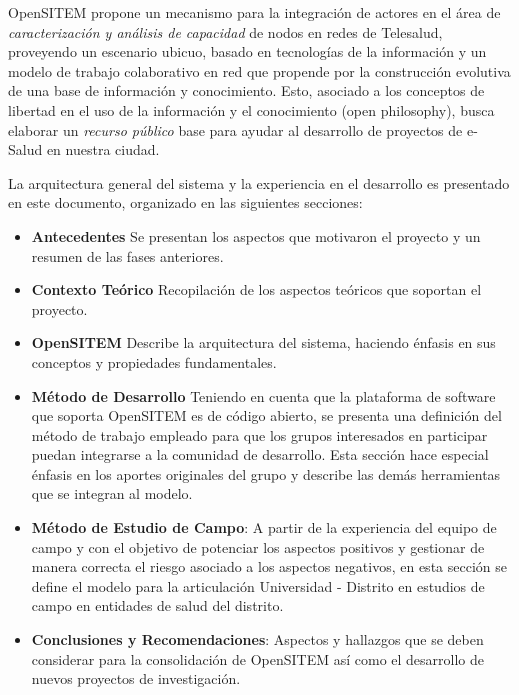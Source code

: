 OpenSITEM propone un mecanismo para la integración de actores en el área de \textit{caracterización y análisis de capacidad} de nodos en redes de Telesalud, proveyendo un escenario ubicuo, basado en tecnologías de la información y un modelo de trabajo colaborativo en red que propende por la construcción evolutiva de una base de información y conocimiento. Esto, asociado a los conceptos de libertad en el uso de la información y el conocimiento (open philosophy), busca elaborar un \textit{recurso público} base para ayudar al desarrollo de proyectos de e-Salud en nuestra ciudad. 

La arquitectura general del sistema y la experiencia en el desarrollo es presentado en este documento, organizado en las siguientes secciones:

\begin{itemize}
 \item \textbf{Antecedentes} Se presentan los aspectos que motivaron el proyecto y un resumen de las fases anteriores.
 \item \textbf{Contexto Teórico} Recopilación de los aspectos teóricos que soportan el proyecto. 
 \item \textbf{OpenSITEM} Describe la arquitectura del sistema, haciendo énfasis en sus conceptos y propiedades fundamentales.
 \item \textbf{Método de Desarrollo} Teniendo en cuenta que la plataforma de software que soporta OpenSITEM es de código abierto, se presenta una definición del método de trabajo empleado para que los grupos interesados en participar puedan integrarse a la comunidad de desarrollo. Esta sección hace especial énfasis en los aportes originales del grupo y describe las demás herramientas que se integran al modelo.
 \item \textbf{Método de Estudio de Campo}: A partir de la experiencia del equipo de campo y con el objetivo de potenciar los aspectos positivos y gestionar de manera correcta el riesgo asociado a los aspectos negativos, en esta sección se define el modelo para la articulación Universidad - Distrito en estudios de campo en entidades de salud del distrito.
 \item \textbf{Conclusiones y Recomendaciones}: Aspectos y hallazgos que se deben considerar para la consolidación de OpenSITEM así como el desarrollo de nuevos proyectos de investigación.
\end{itemize}

